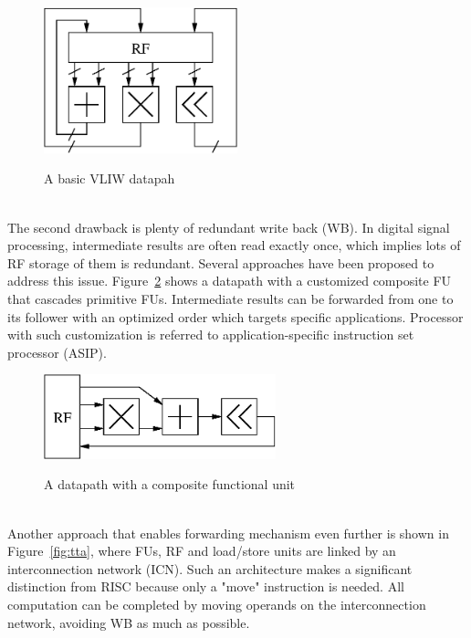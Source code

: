         \begin{figure}[!ht] 
            \caption{A basic VLIW datapah}
            \centering
            \includegraphics[width=0.5\textwidth]{./figs/vliw.eps}
            \label{fig:vliw}
        \end{figure}
        \\\indent
        The second drawback is plenty of redundant write back (WB). 
        In digital signal processing, intermediate results are often read exactly once, which implies lots of RF storage of them is redundant.
        Several approaches have been proposed to address this issue.
        Figure~\ref{fig:cascade} shows a datapath with a customized composite FU that cascades primitive FUs. 
        Intermediate results can be forwarded from one to its follower with an optimized order which targets specific applications.
        Processor with such customization is referred to application-specific instruction set processor (ASIP).
        \begin{figure}[!ht] 
            \caption{A datapath with a composite functional unit}
            \centering
            \includegraphics[width=0.6\textwidth]{./figs/cascade.eps}
            \label{fig:cascade}
        \end{figure}
        \\\indent
        Another approach that enables forwarding mechanism even further is shown in Figure~\ref{fig:tta}, where FUs, RF and load/store units are linked by an interconnection network (ICN).
        Such an architecture makes a significant distinction from RISC because only a "move" instruction is needed. 
        All computation can be completed by moving operands on the interconnection network, avoiding WB as much as possible.

